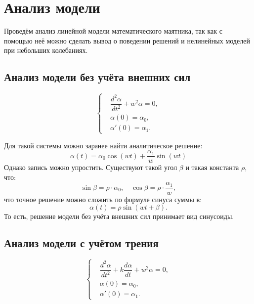 \pagebreak

\section{Анализ модели}
	Проведём анализ линейной модели математического маятника, так как с помощью неё можно сделать вывод о поведении решений и нелинейных моделей при небольших колебаниях.

	\subsection{Анализ модели без учёта внешних сил}
		\begin{equation*}
			\begin{cases}
				& \dfrac{d^2 \alpha}{dt^2} + w^2  \alpha = 0, \\
				& \alpha(0) = \alpha_0, \\
				& \alpha'(0) = \alpha_1.
			\end{cases}
		\end{equation*}

		Для такой системы можно заранее найти аналитическое решение:
		\begin{equation*}
			\alpha(t) = \alpha_0 \cos(wt) + \dfrac{\alpha_1}{w} \sin(wt)
		\end{equation*}
		Однако запись можно упростить. Существуют такой угол \( \beta \) и такая константа \( \rho \), что:
		\begin{equation*}
			\sin \beta = \rho \cdot \alpha_0, \quad 
			\cos \beta = \rho \cdot \dfrac{\alpha_1}{w},
		\end{equation*}
		что точное решение можно сложить по формуле синуса суммы в:
		\begin{equation*}
			\alpha(t) = \rho \sin(wt + \beta).
		\end{equation*}
		То есть, решение модели без учёта внешних сил принимает вид синусоиды.

	\subsection{Анализ модели с учётом трения}
		\begin{equation*}
			\begin{cases}
				& \dfrac{d^2 \alpha}{dt^2} + k \dfrac{d \alpha}{dt} + w^2  \alpha = 0, \\
				& \alpha(0) = \alpha_0, \\
				& \alpha'(0) = \alpha_1.
			\end{cases}
		\end{equation*}

